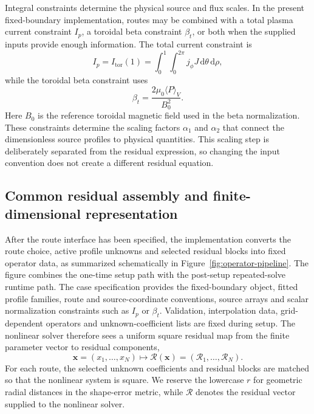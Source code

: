 \documentclass[final, 3p, times]{elsarticle}
\begin{document}
Integral constraints determine the physical source and flux scales. In the present fixed-boundary implementation, routes may be combined with a total plasma current constraint $I_p$, a toroidal beta constraint $\beta_t$, or both when the supplied inputs provide enough information. The total current constraint is
\begin{equation}
    I_p=I_{\mathrm{tor}}(1)=\int_0^1\!\int_0^{2\pi} j_\phi J\,\mathrm{d}\theta\,\mathrm{d}\rho,
\end{equation}
while the toroidal beta constraint uses
\begin{equation}
    \beta_t = \frac{2\mu_0\langle P\rangle_V}{B_0^2} .
\end{equation}
Here $B_0$ is the reference toroidal magnetic field used in the beta normalization.
These constraints determine the scaling factors $\alpha_1$ and $\alpha_2$ that connect the dimensionless source profiles to physical quantities. This scaling step is deliberately separated from the residual expression, so changing the input convention does not create a different residual equation.

\subsection{Common residual assembly and finite-dimensional representation}

After the route interface has been specified, the implementation converts the route choice, active profile unknowns and selected residual blocks into fixed operator data, as summarized schematically in Figure~\ref{fig:operator-pipeline}. The figure combines the one-time setup path with the post-setup repeated-solve runtime path. The case specification provides the fixed-boundary object, fitted profile families, route and source-coordinate conventions, source arrays and scalar normalization constraints such as $I_p$ or $\beta_t$. Validation, interpolation data, grid-dependent operators and unknown-coefficient lists are fixed during setup. The nonlinear solver therefore sees a uniform square residual map from the finite parameter vector to residual components,
\begin{equation}
    \mathbf{x}=(x_1,\ldots,x_{N})
    \mapsto
    \mathcal{R}(\mathbf{x})=(\mathcal{R}_1,\ldots,\mathcal{R}_{N}).
\end{equation}
For each route, the selected unknown coefficients and residual blocks are matched so that the nonlinear system is square. We reserve the lowercase $r$ for geometric radial distances in the shape-error metric, while $\mathcal{R}$ denotes the residual vector supplied to the nonlinear solver.
\end{document}

